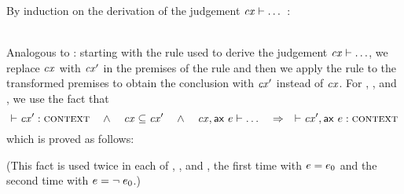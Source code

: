 By induction on the derivation of the judgement $\mathit{cx}\vdash\ldots$\ :

\begin{bycase}

\Case{\Rtinst}
\begin{derivation}
\step{\tdecO\in\cx}{\premof{\Rtinst}}
\end{derivation}

\Case{\restrulesbut{\Reabs}}\\
Analogous to \Rtinst: starting with the rule used to derive the judgement
$\mathit{cx}\vdash\ldots$, we replace $\mathit{cx}$ with $\mathit{cx}'$ in the premises of the rule and
then we apply the rule to the transformed premises to obtain the conclusion
with $\mathit{cx}'$ instead of $\mathit{cx}$. For \Reif, \Rthifsbs, and \Rthif, we use the
fact that
\[
\vdash\mathit{cx}':\textsc{context}\ \ \ \wedge\ \ \
\mathit{cx}\subseteq\mathit{cx}'\ \ \ \wedge\ \ \
\mathit{cx},\mathsf{ax}\ e\vdash\ldots\ \ \ \Rightarrow\ \ \
\vdash\mathit{cx}',\mathsf{ax}\ e:\textsc{context}
\]
which is proved as follows:
\begin{derivation}
\step{\jcxdots{\cx,\axM{\expr}}}{\hyp}
\step{\cxwf{\cx'}}{\hyp}
\step{\cx\subseteq\cx'}{\hyp}
\step{\hasty{\cx'}{\expr}{\bool}}{\indhyp, 5, 4, 3}
\end{derivation}
(This fact is used twice in each of \Reif, \Rthifsbs, and \Rthif, the first
time with $e=e_0$ and the second time with $e=\neg\;e_0$.)


\end{bycase}

